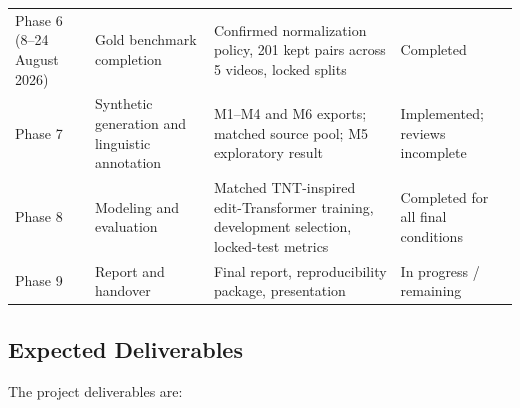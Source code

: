 \documentclass[12pt, a4paper, twoside, openany]{report}
\begin{document}
\begin{table}[H]
\begin{tabularx}{\textwidth}{
			>{\raggedright\arraybackslash}p{2.4cm}
			>{\raggedright\arraybackslash}p{3.2cm}
			>{\raggedright\arraybackslash}X
			>{\raggedright\arraybackslash}p{2.7cm}
		}
		\addlinespace

		Phase 6 (8--24 August 2026) &
		Gold benchmark completion &
		Confirmed normalization policy, 201 kept pairs across 5 videos, locked splits &
		Completed \\

		\addlinespace

		Phase 7 &
		Synthetic generation and linguistic annotation &
		M1--M4 and M6 exports; matched source pool; M5 exploratory result &
		Implemented; reviews incomplete \\

		\addlinespace

		Phase 8 &
		Modeling and evaluation &
		Matched TNT-inspired edit-Transformer training, development selection, locked-test metrics &
		Completed for all final conditions \\

		\addlinespace

		Phase 9 &
		Report and handover &
		Final report, reproducibility package, presentation &
		In progress / remaining \\

		\bottomrule
	\end{tabularx}
\end{table}


\subsection{Expected Deliverables}

The project deliverables are:
\end{document}
